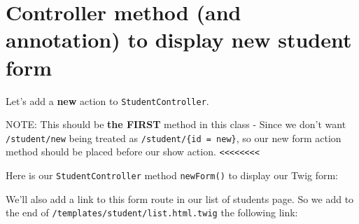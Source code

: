 \documentclass[a4paperpaper,openright]{book}
\newenvironment{Shaded}{}{}
\newcommand{\AnnotationTok}[1]{\textcolor[rgb]{0.38,0.63,0.69}{\textbf{\textit{#1}}}}
\newcommand{\CommentTok}[1]{\textcolor[rgb]{0.38,0.63,0.69}{\textit{#1}}}
\newcommand{\KeywordTok}[1]{\textcolor[rgb]{0.00,0.44,0.13}{\textbf{#1}}}
\newcommand{\NormalTok}[1]{#1}
\newcommand{\OtherTok}[1]{\textcolor[rgb]{0.00,0.44,0.13}{#1}}
\newcommand{\StringTok}[1]{\textcolor[rgb]{0.25,0.44,0.63}{#1}}
\begin{document}
\hypertarget{controller-method-and-annotation-to-display-new-student-form}{%
\section{Controller method (and annotation) to display new student
form}\label{controller-method-and-annotation-to-display-new-student-form}}

Let's add a \textbf{new} action to \texttt{StudentController}.

NOTE: This should be \textbf{the FIRST} method in this class - Since we
don't want \texttt{/student/new} being treated as
\texttt{/student/\{id\ =\ \textquotesingle{}new\textquotesingle{}\}}, so
our new form action method should be placed before our show action.
\texttt{\textless{}\textless{}\textless{}\textless{}\textless{}\textless{}\textless{}\textless{}}

Here is our \texttt{StudentController} method \texttt{newForm()} to
display our Twig form:

\begin{Shaded}
\end{Shaded}

We'll also add a link to this form route in our list of students page.
So we add to the end of \texttt{/templates/student/list.html.twig} the
following link:

\begin{Shaded}
\end{Shaded}
\end{document}
